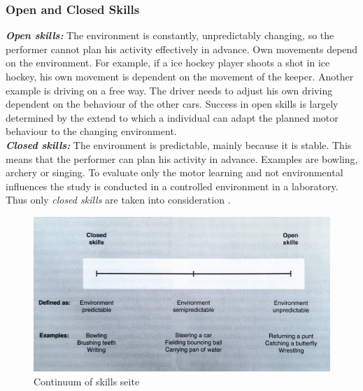 \subsubsection{Open and Closed Skills}
\textit{\textbf{Open skills:}} The environment is constantly, unpredictably changing, so the performer cannot plan his activity effectively in advance. Own movements depend on the environment. For example, if a ice hockey player shoots a shot in ice hockey, his own movement is dependent on the movement of the keeper. Another example is  driving on a free way. The driver needs to adjust his own driving dependent on the behaviour of the other cars. Success in open skills is largely determined by the extend to which a individual can adapt the planned motor behaviour to the changing environment.\\
\textit{\textbf{Closed skills:}} The environment is predictable, mainly because it is stable. This means that the performer can plan his activity in advance. Examples are bowling, archery or singing. To evaluate only the motor learning and not environmental influences the study is conducted in a controlled environment in a laboratory. Thus only \textit{closed skills} are taken into consideration \markAfourSkills.

\begin{figure}
	\centering
	\includegraphics[width=1.0\textwidth]{img/skills_cont.jpg}
	\caption{Continuum of skills \cite{Schmidt2011} \todo seite}
	\label{fig:skills_cont}
\end{figure}

